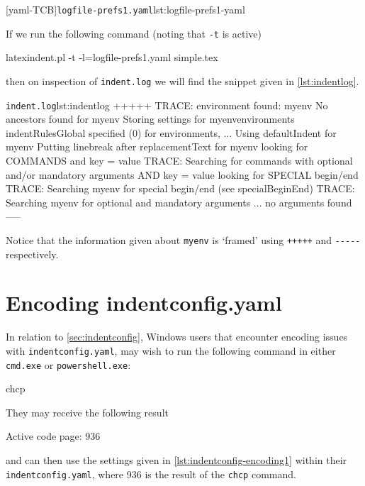 	 \begin{minipage}{.35\linewidth}
	 \end{minipage}
	 \hfill
	 \begin{minipage}{.6\linewidth}
		 [yaml-TCB]{\texttt{logfile-prefs1.yaml}}{lst:logfile-prefs1-yaml}
	 \end{minipage}

	 If we run the following command (noting that \texttt{-t} is active)
	 \begin{commandshell}
latexindent.pl -t -l=logfile-prefs1.yaml simple.tex 
\end{commandshell}
	 then on inspection of \texttt{indent.log} we will find the snippet given in
	 \cref{lst:indentlog}.
	 \begin{cmhlistings}[style=tcblatex,morekeywords={TRACE}]{\texttt{indent.log}}{lst:indentlog}
       +++++
TRACE: environment found: myenv
       No ancestors found for myenv
       Storing settings for myenvenvironments
       indentRulesGlobal specified (0) for environments, ...
       Using defaultIndent for myenv
       Putting linebreak after replacementText for myenv
       looking for COMMANDS and key = {value}
TRACE: Searching for commands with optional and/or mandatory arguments AND key = {value}
       looking for SPECIAL begin/end
TRACE: Searching myenv for special begin/end (see specialBeginEnd)
TRACE: Searching myenv for optional and mandatory arguments
       ... no arguments found
       -----
     \end{cmhlistings}
	 Notice that the information given about \texttt{myenv} is `framed' using \texttt{+++++}
	 and \lstinline!-----! respectively.

	\section{Encoding indentconfig.yaml}\label{app:encoding}
	 In relation to \vref{sec:indentconfig}, Windows users that encounter encoding issues with
	 \texttt{indentconfig.yaml}, may wish to run the following command in either
	 \texttt{cmd.exe} or \texttt{powershell.exe}:
	 \begin{dosprompt}
chcp
    \end{dosprompt}
	 They may receive the following result
	 \begin{dosprompt}
Active code page: 936
    \end{dosprompt}
	 and can then use the settings given in \cref{lst:indentconfig-encoding1} within their
	 \texttt{indentconfig.yaml}, where 936 is the result of the \texttt{chcp} command.

